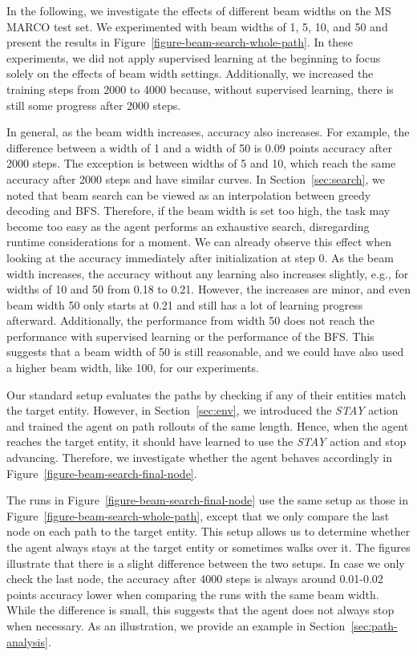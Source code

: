 In the following, we investigate the effects of different beam widths on the MS MARCO test set. We experimented with 
beam widths of 1, 5, 10, and 50 and present the results in Figure~\ref{figure-beam-search-whole-path}. In these experiments, we did not apply 
supervised learning at the beginning to focus solely on the effects of beam width settings. Additionally, 
we increased the training steps from 2000 to 4000 because, without supervised learning, there is still 
some progress after 2000 steps.

In general, as the beam width increases, accuracy also increases. For example, the difference between a width of 1 and a width of 50 is 0.09 points accuracy after 2000 steps.
The exception is between widths of 5 and 10, which reach the same accuracy after 2000 steps and have similar curves.
In Section~\ref{sec:search}, we noted that beam search can be viewed as an interpolation between greedy decoding and BFS.
Therefore, if the beam width is set too high, the task may become too easy as the agent performs an exhaustive search, disregarding runtime considerations for a moment.
We can already observe this effect when looking at the accuracy immediately after initialization at step 0.
As the beam width increases, the accuracy without any learning also increases slightly, e.g., for widths of 10 and 50 from 0.18 to 0.21.
However, the increases are minor, and even beam width 50 only starts at 0.21 and still has a lot of learning progress afterward.
Additionally, the performance from width 50 does not reach the performance with supervised learning or the performance of the BFS.
This suggests that a beam width of 50 is still reasonable, and we could have also used a higher beam width, like 100, for our experiments. 

Our standard setup evaluates the paths by checking if any of their entities match the target entity. 
However, in Section~\ref{sec:env}, we introduced the \textit{STAY} action and trained the agent 
 on path rollouts of the same length.
 Hence, when the agent reaches the target entity, it should have learned to use the \textit{STAY} action and stop advancing.
Therefore, we investigate whether the agent behaves accordingly in Figure~\ref{figure-beam-search-final-node}.

The runs in Figure~\ref{figure-beam-search-final-node} use the same setup as those in Figure~\ref{figure-beam-search-whole-path}, 
except that we only compare the last node on each path to the target entity.
This setup allows us to determine whether the agent always stays at the target entity or sometimes walks over it.
The figures illustrate that there is a slight difference between the two setups.
In case we only check the last node, the accuracy after 4000 steps is always around 0.01-0.02 points accuracy lower when comparing the runs with the same beam width.
While the difference is small, this suggests that the agent does not always stop when necessary.
As an illustration, we provide an example in Section~\ref{sec:path-analysis}.


